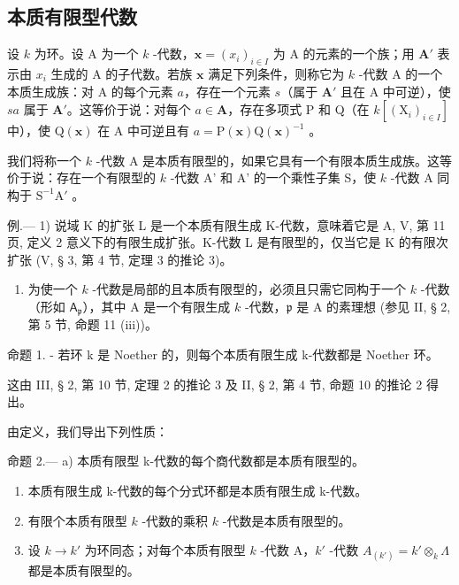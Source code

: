 \subsection{本质有限型代数}

设 \(k\) 为环。设 A 为一个 \(k\) -代数，\(\mathbf{x} = (x_i)_{i \in I}\) 为 A 的元素的一个族；用 \(\mathbf{A}'\) 表示由 \(x_i\) 生成的 A 的子代数。若族 \(\mathbf{x}\) 满足下列条件，则称它为 \(k\) -代数 A 的一个本质生成族：对 A 的每个元素 \(a\)，存在一个元素 \(s\)（属于 \(\mathbf{A}'\) 且在 A 中可逆），使 \(sa\) 属于 \(\mathbf{A}'\)。这等价于说：对每个 \(a \in \mathbf{A}\)，存在多项式 P 和 Q（在 \(k[(\mathrm{X}_i)_{i \in I}]\) 中），使 \(\mathrm{Q}(\mathbf{x})\) 在 A 中可逆且有 \(a = \mathrm{P}(\mathbf{x})\mathrm{Q}(\mathbf{x})^{-1}\) 。

我们将称一个 \(k\) -代数 A 是本质有限型的，如果它具有一个有限本质生成族。这等价于说：存在一个有限型的 \(k\) -代数 A' 和 A' 的一个乘性子集 S，使 \(k\) -代数 A 同构于 \(\mathrm{S}^{-1}\mathrm{A}'\) 。

例.--- 1) 说域 K 的扩张 L 是一个本质有限生成 K-代数，意味着它是 A, V, 第 11 页, 定义 2 意义下的有限生成扩张。K-代数 L 是有限型的，仅当它是 K 的有限次扩张 (V, § 3, 第 4 节, 定理 3 的推论 3)。

\begin{enumerate}
\def\labelenumi{\arabic{enumi})}
\setcounter{enumi}{1}
\tightlist
\item
  为使一个 \(k\) -代数是局部的且本质有限型的，必须且只需它同构于一个 \(k\) -代数（形如 \(\mathsf{A}_{\mathfrak{p}}\)），其中 A 是一个有限生成 \(k\) -代数，\(\mathfrak{p}\) 是 A 的素理想 (参见 II, § 2, 第 5 节, 命题 11 (iii))。
\end{enumerate}

命题 1. - 若环 k 是 Noether 的，则每个本质有限生成 k-代数都是 Noether 环。

这由 III, § 2, 第 10 节, 定理 2 的推论 3 及 II, § 2, 第 4 节, 命题 10 的推论 2 得出。

由定义，我们导出下列性质：

命题 2.--- a) 本质有限型 k-代数的每个商代数都是本质有限型的。

\begin{enumerate}
\def\labelenumi{\alph{enumi})}
\setcounter{enumi}{1}
\item
  本质有限生成 k-代数的每个分式环都是本质有限生成 k-代数。
\item
  有限个本质有限型 \(k\) -代数的乘积 \(k\) -代数是本质有限型的。
\item
  设 \(k \to k'\) 为环同态；对每个本质有限型 \(k\) -代数 A，\(k'\) -代数 \(A_{(k')} = k' \otimes_k \Lambda\) 都是本质有限型的。
\end{enumerate}

